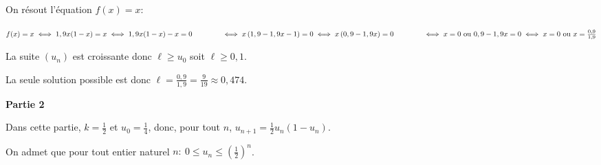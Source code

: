 \begin{enumerate}
\begin{enumerate}
On résout l'équation $f(x)=x$:

$f(x)=x 
\iff 1,9x(1-x)= x
\iff 1,9x(1-x)-x =0\\
\phantom{f(x)= x}
\iff x\left (1,9 - 1,9x -1\right )=0
\iff x\left (0,9 - 1,9x\right )=0\\
\phantom{f(x)=x}
\iff x=0 \text{ ou } 0,9-1,9x=0
\iff x=0 \text{ ou } x=\frac{0,9}{1,9}$

La suite $(u_n)$ est croissante donc $\ell \geqslant u_0$ soit $\ell \geqslant 0,1$.

La seule solution possible est donc $\ell = \frac{0,9}{1,9}=\frac{9}{19}\approx 0,474$.
	\end{enumerate}
\end{enumerate}

\bigskip

\textbf{Partie 2}

\medskip

 Dans cette partie, $k= \frac12$  et $u_0 = \frac14$, donc, pour tout $n$,\: $u_{n+1} = \frac12 u_n \left(1 - u_n\right)$.

On admet que pour tout entier naturel $n :\: 0 \leqslant u_n \leqslant \left(\frac12\right)^n$.


